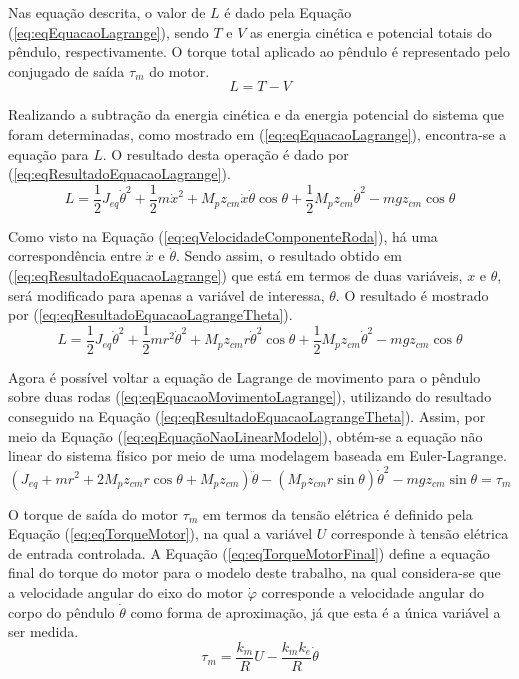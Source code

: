 Nas equação descrita, o valor de $L$ é dado pela Equação (\ref{eq:eqEquacaoLagrange}), sendo $T$ e $V$ as energia cinética e potencial totais do pêndulo, respectivamente. O torque total aplicado ao pêndulo é representado pelo conjugado de saída $\tau_m$ do motor. 
\begin{equation}\label{eq:eqEquacaoLagrange}
    L = T - V
\end{equation}

Realizando a subtração da energia cinética e da energia potencial do sistema que foram determinadas, como mostrado em (\ref{eq:eqEquacaoLagrange}), encontra-se a equação para $L$. O resultado desta operação é dado por (\ref{eq:eqResultadoEquacaoLagrange}).
\begin{equation}\label{eq:eqResultadoEquacaoLagrange}
    L = \dfrac{1}{2}J_{eq}\dot{\theta}^2 + \dfrac{1}{2}m\dot{x}^2 + M_{p}z_{cm}\dot{x}\dot{\theta}\cos{\theta} + \dfrac{1}{2}M_{p}z_{cm}\dot{\theta}^2 - mgz_{cm}\cos{\theta}
\end{equation}

Como visto na Equação (\ref{eq:eqVelocidadeComponenteRoda}), há uma correspondência entre $\dot{x}$ e $\dot{\theta}$. Sendo assim, o resultado obtido em (\ref{eq:eqResultadoEquacaoLagrange}) que está em termos de duas variáveis, $x$ e $\theta$, será modificado para apenas a variável de interessa, $\theta$. O resultado é mostrado por (\ref{eq:eqResultadoEquacaoLagrangeTheta}).
\begin{equation}\label{eq:eqResultadoEquacaoLagrangeTheta}
    L = \dfrac{1}{2}J_{eq}\dot{\theta}^2 + \dfrac{1}{2}mr^2\dot{\theta}^2 + M_{p}z_{cm}r\dot{\theta}^2\cos{\theta} + \dfrac{1}{2}M_{p}z_{cm}\dot{\theta}^2 - mgz_{cm}\cos{\theta}
\end{equation}

Agora é possível voltar a equação de Lagrange de movimento para o pêndulo sobre duas rodas (\ref{eq:eqEquacaoMovimentoLagrange}), utilizando do resultado conseguido na Equação (\ref{eq:eqResultadoEquacaoLagrangeTheta}). Assim, por meio da Equação (\ref{eq:eqEquaçãoNaoLinearModelo}), obtém-se a equação não linear do sistema físico por meio de uma modelagem baseada em Euler-Lagrange.
\begin{equation}\label{eq:eqEquaçãoNaoLinearModelo}
    (J_{eq} + mr^2 + 2M_{p}z_{cm}r\cos{\theta} + M_{p}z_{cm})\ddot{\theta} - (M_{p}z_{cm}r\sin{\theta})\dot{\theta}^2 - mgz_{cm}\sin{\theta } = \tau_{m}
\end{equation}

O torque de saída do motor $\tau_{m}$ em termos da tensão elétrica é definido pela Equação (\ref{eq:eqTorqueMotor}), na qual a variável $U$ corresponde à tensão elétrica de entrada controlada. A Equação (\ref{eq:eqTorqueMotorFinal}) define a equação final do torque do motor para o modelo deste trabalho, na qual considera-se que a velocidade angular do eixo do motor $\dot{\varphi}$ corresponde a velocidade angular do corpo do pêndulo $\dot{\theta}$ como forma de aproximação, já que esta é a única variável a ser medida.
\begin{equation}\label{eq:eqTorqueMotorFinal}
    \tau_{m} = \dfrac{k_{m}}{R}U - \dfrac{k_{m}k_{e}}{R}\dot{\theta}
\end{equation}

